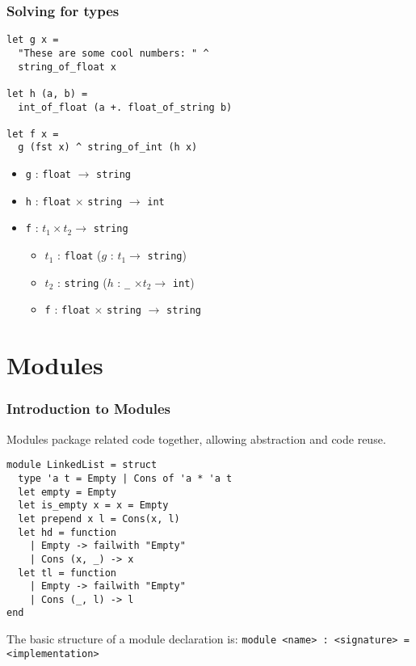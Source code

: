 \documentclass{beamer}
\begin{document}
\begin{frame}[fragile]
\frametitle{Solving for types}
\begin{lstlisting}
let g x =
  "These are some cool numbers: " ^
  string_of_float x

let h (a, b) =
  int_of_float (a +. float_of_string b)
  
let f x =
  g (fst x) ^ string_of_int (h x)
\end{lstlisting}
\pause

\begin{itemize}
\item \verb|g| \pause : \verb|float| $\rightarrow$ \verb|string| \pause
\item \verb|h| \pause : \verb|float| $\times$ \verb|string| $\rightarrow$ \verb|int| \pause
\item \verb|f| \pause : $t_1 \times t_2 \rightarrow$ \verb|string| \pause
\begin{itemize}
\item $t_1$ \pause : \verb|float| \quad ($g$ : $t_1 \rightarrow$ \verb|string|) \pause
\item $t_2$ \pause : \verb|string|  \quad ($h$ : \verb|_| $\times t_2 \rightarrow$ \verb|int|) \pause
\item \verb|f| \pause : \verb|float| $\times$ \verb|string| $\rightarrow$ \verb|string|
\end{itemize}
\end{itemize}
\end{frame}

\section{Modules}

\begin{frame}[fragile]
\frametitle{Introduction to Modules}
Modules package related code together, allowing abstraction and code reuse.
\begin{lstlisting}
module LinkedList = struct
  type 'a t = Empty | Cons of 'a * 'a t
  let empty = Empty
  let is_empty x = x = Empty
  let prepend x l = Cons(x, l)
  let hd = function
    | Empty -> failwith "Empty" 
    | Cons (x, _) -> x
  let tl = function
    | Empty -> failwith "Empty" 
    | Cons (_, l) -> l
end
\end{lstlisting}
\pause
The basic structure of a module declaration is:
\verb|module <name> : <signature> = <implementation>|

\end{frame}
\end{document}
